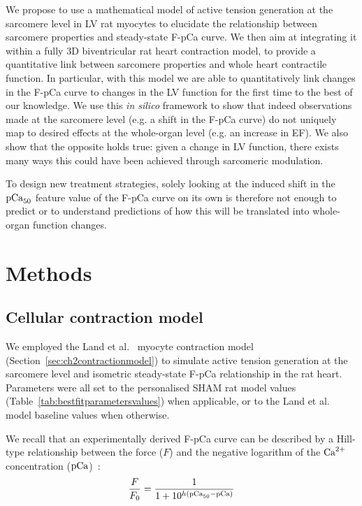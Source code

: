 We propose to use a mathematical model of active tension generation at the sarcomere level in LV rat myocytes to elucidate the relationship between sarcomere properties and steady-state F-pCa curve. We then aim at integrating it within a fully $3$D biventricular rat heart contraction model, to provide a quantitative link between sarcomere properties and whole heart contractile function. In particular, with this model we are able to quantitatively link changes in the F-pCa curve to changes in the LV function for the first time to the best of our knowledge. We use this \textit{in silico} framework to show that indeed observations made at the sarcomere level (e.g. a shift in the F-pCa curve) do not uniquely map to desired effects at the whole-organ level (e.g. an increase in EF). We also show that the opposite holds true: given a change in LV function, there exists many ways this could have been achieved through sarcomeric modulation.

To design new treatment strategies, solely looking at the induced shift in the $\textrm{pCa}_{50}$ feature value of the F-pCa curve on its own is therefore not enough to predict or to understand predictions of how this will be translated into whole-organ function changes.


%
%
%
\section{Methods}\label{sec:ch8methods}


%
%
%
\subsection{Cellular contraction model}\label{sec:cellcontr}
We employed the Land et al.~\cite{Land:2012} myocyte contraction model (Section~\ref{sec:ch2contractionmodel}) to simulate active tension generation at the sarcomere level and isometric steady-state F-pCa relationship in the rat heart. Parameters were all set to the personalised SHAM rat model values (Table~\ref{tab:bestfitparametersvalues}) when applicable, or to the Land et al.~\cite{Land:2012} model baseline values when otherwise.

\vspace{0.2cm}
We recall that an experimentally derived F-pCa curve can be described by a Hill-type relationship between the force ($F$) and the negative logarithm of the $\textrm{Ca}^{2+}$ concentration ($\textrm{pCa}$)~\cite{Walker:2010}:
%
\begin{equation}
    \frac{F}{F_0} = \frac{1}{1+10^{h(\textrm{pCa}_{50}-\textrm{pCa})}}
\end{equation}

